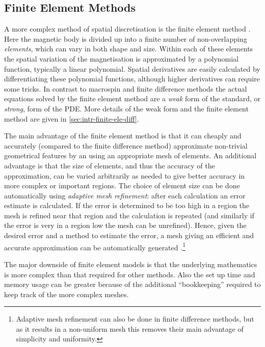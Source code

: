 \subsection{Finite Element Methods}
\label{sec:sd-finite-elem-meth}

A more complex method of spatial discretisation is the finite element method \cite{HowardElmanDavidSilvester2006}.
Here the magnetic body is divided up into a finite number of non-overlapping \emph{elements}, which can vary in both shape and size.
Within each of these elements the spatial variation of the magnetisation is approximated by a polynomial function, typically a linear polynomial.
Spatial derivatives are easily calculated by differentiating these polynomial functions, although higher derivatives can require some tricks.
In contrast to macrospin and finite difference methods the actual equations solved by the finite element method are a \emph{weak} form of the standard, or \emph{strong}, form of the PDE.
More details of the weak form and the finite element method are given in \cref{sec:intr-finite-ele-diff}.

The main advantage of the finite element method is that it can cheaply and accurately (compared to the finite difference method) approximate non-trivial geometrical features by an using an appropriate mesh of elements.
An additional advantage is that the size of elements, and thus the accuracy of the approximation, can be varied arbitrarily as needed to give better accuracy in more complex or important regions.
The choice of element size can be done automatically using \emph{adaptive mesh refinement}: after each calculation an error estimate is calculated.
If the error is determined to be too high in a region the mesh is refined near that region and the calculation is repeated (and similarly if the error is very in a region low the mesh can be unrefined).
Hence, given the desired error and a method to estimate the error, a mesh giving an efficient and accurate approximation can be automatically generated \cite{Schrefl1999}.\footnote{Adaptive mesh refinement can also be done in finite difference methods, but as it results in a non-uniform mesh this removes their main advantage of simplicity and uniformity.}

The major downside of finite element models is that the underlying mathematics is more complex than that required for other methods.
Also the set up time and memory usage can be greater because of the additional ``bookkeeping'' required to keep track of the more complex meshes.


